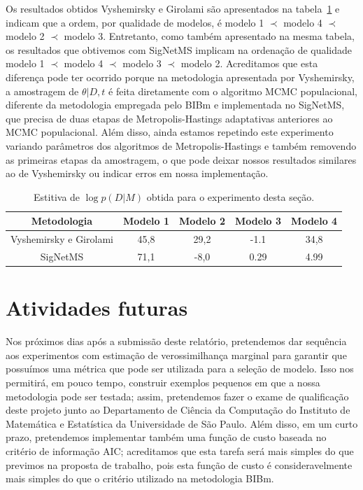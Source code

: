 \documentclass[12pt]{article}
\begin{document}
Os resultados obtidos Vyshemirsky e Girolami são apresentados na 
tabela~\ref{tab:vyshemirsky} e indicam que a ordem, por qualidade de 
modelos, é modelo 1 $\prec$ modelo 4 $\prec$ modelo 2 $\prec$ modelo 3. 
Entretanto, como também apresentado na mesma tabela, os resultados que 
obtivemos com SigNetMS implicam na ordenação de qualidade modelo 1 
$\prec$ modelo 4 $\prec$ modelo 3 $\prec$ modelo 2. Acreditamos que esta 
diferença pode ter ocorrido porque na metodologia apresentada por 
Vyshemirsky, a amostragem de $\theta | D, t$ é feita diretamente com o 
algoritmo MCMC populacional, diferente da metodologia empregada pelo 
BIBm e implementada no SigNetMS, que precisa de duas etapas de 
Metropolis-Hastings adaptativas anteriores ao MCMC populacional. Além
disso, ainda estamos repetindo este experimento variando parâmetros dos
algoritmos de Metropolis-Hastings e também removendo as primeiras 
etapas da amostragem, o que pode deixar nossos resultados similares ao
de Vyshemirsky ou indicar erros em nossa implementação.

\begin{table}[ht!]
    \caption{Estitiva de $\log p(D | M)$ obtida para o experimento desta
    seção.}
    \label{tab:vyshemirsky}
    \begin{center}
    \smallskip
    \begin{tabular} {c | c c c c}
        \toprule
        Metodologia & Modelo 1 & Modelo 2 & Modelo 3 & Modelo 4\\
        \hline
        Vyshemirsky e Girolami & 45,8 & 29,2 & -1.1 & 34,8 \\
        SigNetMS &               71,1 & -8,0 &  0.29 & 4.99 \\
        \bottomrule
    \end{tabular}
    \end{center}
\end{table}

\section{Atividades futuras}
Nos próximos dias após a submissão deste relatório, pretendemos dar 
sequência aos experimentos com estimação de verossimilhança marginal 
para garantir que possuímos uma métrica que pode ser utilizada para a
seleção de modelo. Isso nos permitirá, em pouco tempo, construir 
exemplos pequenos em que a nossa metodologia pode ser testada; assim,
pretendemos fazer o exame de qualificação deste projeto junto ao 
Departamento de Ciência da Computação do Instituto de Matemática e 
Estatística da Universidade de São Paulo. Além disso, em um curto prazo,
pretendemos implementar também uma função de custo baseada no critério
de informação AIC; acreditamos que esta tarefa será mais simples do que
previmos na proposta de trabalho, pois esta função de custo é 
consideravelmente mais simples do que o critério utilizado na 
metodologia BIBm.
\end{document}
